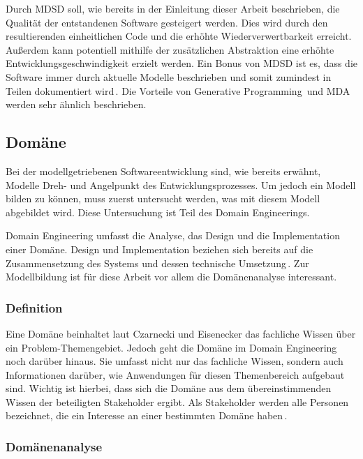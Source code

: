 \documentclass[12pt,oneside,a4paper,parskip]{scrbook}
\begin{document}
Durch MDSD soll, wie bereits in der Einleitung dieser Arbeit beschrieben, die Qualität der entstandenen Software gesteigert werden. Dies wird durch den resultierenden einheitlichen Code und die erhöhte Wiederverwertbarkeit erreicht. Außerdem kann potentiell mithilfe der zusätzlichen Abstraktion eine erhöhte Entwicklungsgeschwindigkeit erzielt werden. Ein Bonus von MDSD ist es, dass die Software immer durch aktuelle Modelle beschrieben und somit zumindest in Teilen dokumentiert wird\,\cite[S. 13ff.]{stahl2007}. Die Vorteile von Generative Programming\,\cite[S. 13ff.]{czaeis2000} und MDA\,\cite{mdaguide} werden sehr ähnlich beschrieben.

\subsection{Domäne}

Bei der modellgetriebenen Softwareentwicklung sind, wie bereits erwähnt, Modelle Dreh- und Angelpunkt des Entwicklungsprozesses. Um jedoch ein Modell bilden zu können, muss zuerst untersucht werden, was mit diesem Modell abgebildet wird. Diese Untersuchung ist Teil des Domain Engineerings.

Domain Engineering umfasst die Analyse, das Design und die Implementation einer Domäne. Design und Implementation beziehen sich bereits auf die Zusammensetzung des Systems und dessen technische Umsetzung\,\cite[S. 21f.]{czaeis2000}. Zur Modellbildung ist für diese Arbeit vor allem die Domänenanalyse interessant.

\subsubsection{Definition}

Eine Domäne beinhaltet laut Czarnecki und Eisenecker das fachliche Wissen über ein Problem-Themengebiet. Jedoch geht die Domäne im Domain Engineering noch darüber hinaus. Sie umfasst nicht nur das fachliche Wissen, sondern auch Informationen darüber, wie Anwendungen für diesen Themenbereich aufgebaut sind. Wichtig ist hierbei, dass sich die Domäne aus dem übereinstimmenden Wissen der beteiligten Stakeholder ergibt. Als Stakeholder werden alle Personen bezeichnet, die ein Interesse an einer bestimmten Domäne haben\,\cite[S. 33]{czaeis2000}.

\subsubsection{Domänenanalyse}
\end{document}
